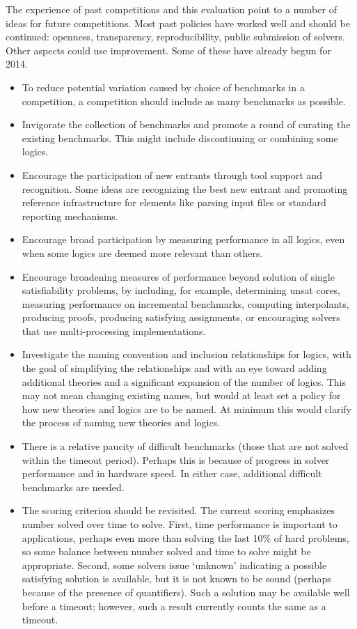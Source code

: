 \documentclass[smallcondensed]{svjour3}
\begin{document}
The experience of past competitions and this evaluation point to a number of ideas for future competitions. Most past policies have worked well and should be continued: openness, transparency, reproducibility, public submission of solvers. Other aspects could use improvement. Some of these have already begun for 2014.
\begin{itemize}
\item To reduce potential variation caused by choice of benchmarks in a competition, a competition should include as many benchmarks as possible.
\item Invigorate the collection of benchmarks and promote a round of curating the existing benchmarks. This might include discontinuing or combining some logics.
\item Encourage the participation of new entrants through tool support and recognition. Some ideas are recognizing the best new entrant and promoting reference infrastructure for elements like parsing input files or standard reporting mechanisms.
\item Encourage broad participation by measuring performance in all logics, even when some logics are deemed more relevant than others.
\item Encourage broadening measures of performance beyond solution of single satisfiability problems, by including, for example, determining unsat cores, measuring performance on incremental benchmarks, computing interpolants, producing proofs, producing satisfying assignments, or encouraging solvers that use multi-processing implementations.
\item Investigate the naming convention and inclusion relationships for logics, with the goal of simplifying the relationships and with an eye toward adding additional theories and a significant expansion of the number of logics. This may not mean changing existing names, but would at least set a policy for how new theories and logics are to be named. At minimum this would clarify the process of naming new theories and logics.
\item There is a relative paucity of difficult benchmarks (those that are not solved within the timeout period). Perhaps this is because of progress in solver performance and in hardware speed. In either case, additional difficult benchmarks are needed.
\item The scoring criterion should be revisited. The current scoring emphasizes number solved over time to solve. First, time performance is important to applications, perhaps even more than solving the last 10\% of hard problems, so some balance between number solved and time to solve might be appropriate. Second, some solvers issue `unknown' indicating a possible satisfying solution is available, but it is not known to be sound (perhaps because of the presence of quantifiers). Such a solution may be available well before a timeout; however, such a result currently counts the same as a timeout.
\end{itemize}
\end{document}
